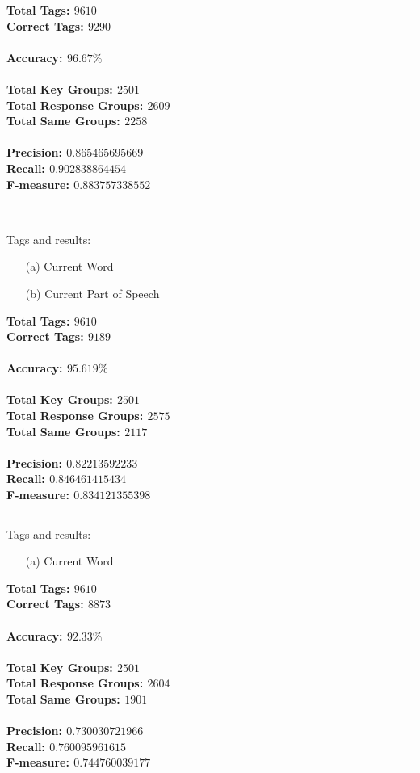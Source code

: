 \documentclass[ruled]{article}
\begin{document}
\large{
\textbf{Total Tags: $9610$} \\
\textbf{Correct Tags: $9290$} \\
\\
\textbf{Accuracy: $96.67\%$} \\
\\
\textbf{Total Key Groups: $2501$} \\
\textbf{Total Response Groups: $2609$} \\
\textbf{Total Same Groups: $2258$} \\
\\
\textbf{Precision: $0.865465695669$} \\
\textbf{Recall: $0.902838864454$} \\
\textbf{F-measure: $0.883757338552$} \\
}

\noindent\rule{15cm}{0.4pt}
\\
Tags and results:
\begin{itemize}
\item[(a)] Current Word
\item[(b)] Current Part of Speech
\end{itemize}
\large{
\textbf{Total Tags: $9610$} \\
\textbf{Correct Tags: $9189$} \\
\\
\textbf{Accuracy: $95.619\%$} \\
\\
\textbf{Total Key Groups: $2501$} \\
\textbf{Total Response Groups: $2575$} \\
\textbf{Total Same Groups: $2117$} \\
\\
\textbf{Precision: $0.82213592233$} \\
\textbf{Recall: $0.846461415434$} \\
\textbf{F-measure: $0.834121355398$} \\
}

\noindent\rule{15cm}{0.4pt}

Tags and results:
\begin{itemize}
\item[(a)] Current Word
\end{itemize}
\large{
\textbf{Total Tags: $9610$} \\
\textbf{Correct Tags: $8873$} \\
\\
\textbf{Accuracy: $92.33\%$} \\
\\
\textbf{Total Key Groups: $2501$} \\
\textbf{Total Response Groups: $2604$} \\
\textbf{Total Same Groups: $1901$} \\
\\
\textbf{Precision: $0.730030721966$} \\
\textbf{Recall: $0.760095961615$} \\
\textbf{F-measure: $0.744760039177$} \\
}
\end{document}
